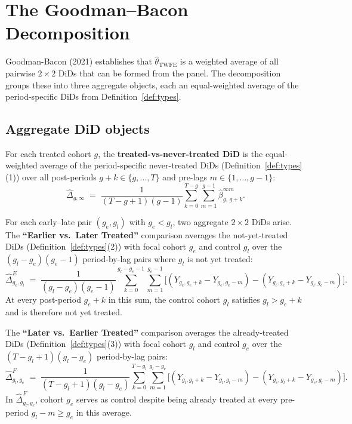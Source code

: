 \documentclass[12pt,letterpaper]{article}
\theoremstyle{remark}
\theoremstyle{definition}
\newcommand{\TWFE}{\hat{\theta}_{\mathrm{TWFE}}}
\newcommand{\hbeta}{\hat{\beta}}
\newcommand{\hDelta}{\hat{\Delta}}
\begin{document}
\section{The Goodman--Bacon Decomposition}
\label{sec:gb}

Goodman-Bacon (2021) establishes that $\TWFE$ is a weighted average of all
pairwise $2\times2$ DiDs that can be formed from the panel. The decomposition
groups these into three aggregate objects, each an equal-weighted average of
the period-specific DiDs from Definition~\ref{def:types}.

\subsection*{Aggregate DiD objects}

For each treated cohort $g$, the \textbf{treated-vs-never-treated DiD} is the
equal-weighted average of the period-specific never-treated DiDs
(Definition~\ref{def:types}(1)) over all post-periods $g+k\in\{g,\ldots,T\}$
and pre-lags $m\in\{1,\ldots,g-1\}$:
\begin{equation}
  \hDelta_{g,\infty}
  \;=\;
  \frac{1}{(T-g+1)(g-1)}
  \sum_{k=0}^{T-g}\sum_{m=1}^{g-1}
  \hbeta^{\infty m}_{g,\,g+k}.
  \label{eq:did_nt}
\end{equation}

For each early--late pair $(g_e,g_l)$ with $g_e<g_l$, two aggregate $2\times2$
DiDs arise. The \textbf{``Earlier vs.\ Later Treated''} comparison averages the
not-yet-treated DiDs (Definition~\ref{def:types}(2)) with focal cohort $g_e$
and control $g_l$ over the $(g_l-g_e)(g_e-1)$ period-by-lag pairs where $g_l$
is not yet treated:
\begin{equation}
  \hDelta_{g_e,g_l}^{E}
  \;=\;
  \frac{1}{(g_l-g_e)(g_e-1)}
  \sum_{k=0}^{g_l-g_e-1}\sum_{m=1}^{g_e-1}
  \bigl[(Y_{g_e,g_e+k}-Y_{g_e,g_e-m})-(Y_{g_l,g_e+k}-Y_{g_l,g_e-m})\bigr].
  \label{eq:did_early}
\end{equation}
At every post-period $g_e+k$ in this sum, the control cohort $g_l$ satisfies
$g_l > g_e+k$ and is therefore not yet treated.

The \textbf{``Later vs.\ Earlier Treated''} comparison averages the
already-treated DiDs (Definition~\ref{def:types}(3)) with focal cohort $g_l$
and control $g_e$ over the $(T-g_l+1)(g_l-g_e)$ period-by-lag pairs:
\begin{equation}
  \hDelta_{g_l,g_e}^{F}
  \;=\;
  \frac{1}{(T-g_l+1)(g_l-g_e)}
  \sum_{k=0}^{T-g_l}\sum_{m=1}^{g_l-g_e}
  \bigl[(Y_{g_l,g_l+k}-Y_{g_l,g_l-m})-(Y_{g_e,g_l+k}-Y_{g_e,g_l-m})\bigr].
  \label{eq:did_forbidden}
\end{equation}
In $\hDelta_{g_l,g_e}^F$, cohort $g_e$ serves as control despite being already
treated at every pre-period $g_l-m\geq g_e$ in this average.
\end{document}
